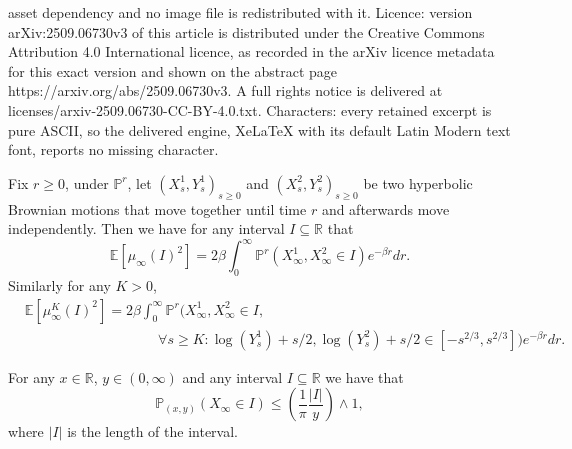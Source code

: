 \documentclass[10pt,a4paper]{amsart}
\newcommand*{\EE}{\ensuremath{\mathbb{E}}}	        	%
\newcommand*{\PP}{\ensuremath{\mathbb{P}}}	        	%
\newcommand*{\RR}{\ensuremath{\mathbb{R}}}	        	%
\begin{document}
asset dependency and no image file is redistributed with it. Licence: version arXiv:2509.06730v3 of this article is distributed under the Creative Commons Attribution 4.0 International licence, as recorded in the arXiv licence metadata for this exact version and shown on the abstract page https://arxiv.org/abs/2509.06730v3. A full rights notice is delivered at licenses/arxiv-2509.06730-CC-BY-4.0.txt. Characters: every retained excerpt is pure ASCII, so the delivered engine, XeLaTeX with its default Latin Modern text font, reports no missing character.
\begin{lem} \label{lemma:many_to_two}
    {Fix $r\geq 0$,} under $\PP^r$, let $(X_s^1,Y_s^1)_{s\geq 0}$ and $(X_s^2,Y_s^2)_{s\geq 0}$ be two hyperbolic Brownian motions that move together until time $r$ and afterwards move independently. Then we have for any interval $I\subseteq \RR$ that 
    \begin{equation*}
        \EE\left[\mu_\infty(I)^2\right] = 2\beta\int_0^\infty\PP^r\left(X^1_\infty,X_\infty^2\in I\right) e^{-\beta r}dr.
    \end{equation*}
    Similarly for any $K>0$,
        \begin{align*}
        &\EE\left[\mu_\infty^K(I)^2\right] = 2\beta\int_0^\infty\PP^r\bigg(X^1_\infty,X_\infty^2\in I, \\ 
        & \hspace{4cm}\forall s\geq K: \log(Y_s^1)+s/2, \log(Y_s^2)+s/2 \in [-s^{2/3},s^{2/3}]\bigg) e^{-\beta r}dr.
    \end{align*}
\end{lem}

\begin{lem}\label{lem:bound_on_bm}
    For any $x\in \RR$, $y\in (0,\infty)$ and any interval $I\subseteq \RR$ we have that
    \begin{equation*}
        \PP_{(x,y)} (X_\infty\in I)\leq\left( \frac{1}{\pi} \frac{\vert I \vert}{y} \right)\wedge 1,
    \end{equation*}
    {where $\vert I \vert$ is the length of the interval.}
\end{lem}
\end{document}
